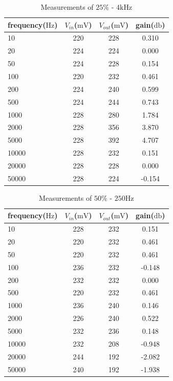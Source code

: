 \begin{table}[!htbp]
	\centering
	\caption{Measurements of $25\%$ - $4\si{\kilo\hertz}$}
	\label{tab:data02}
	\begin{tabular}{lccc}
		\toprule
		frequency($\si{\hertz}$) & $V_{in}$($\si{\milli\volt}$) & $V_{out}$($\si{\milli\volt}$) & gain($\si{\decibel}$) \\
		\midrule
		10&	220&	228&	0.310\\
		20&	224&	224&	0.000\\
		50&	224&	228&	0.154\\
		100&	220&	232&	0.461\\
		200&	224&	240&	0.599\\
		500&	224&	244&	0.743\\
		1000&	228&	280&	1.784\\
		2000&	228&	356&	3.870\\
		5000&	228&	392&	4.707\\
		10000&	228&	232&	0.151\\
		20000&	228&	228&	0.000\\
		50000&	228&	224&	-0.154\\
		\bottomrule
	\end{tabular}
\end{table}


\begin{table}[!htbp]
	\centering
	\caption{Measurements of $50\%$ - $250\si{\hertz}$}
	\label{tab:data10}
	\begin{tabular}{lccc}
		\toprule
		frequency($\si{\hertz}$) & $V_{in}$($\si{\milli\volt}$) & $V_{out}$($\si{\milli\volt}$) & gain($\si{\decibel}$) \\
		\midrule
		10&	228&	232&	0.151\\
		20&	220&	232&	0.461\\
		50&	220&	232&	0.461\\
		100&	236&	232&	-0.148\\
		200&	232&	232&	0.000\\
		500&	220&	232&	0.461\\
		1000&	236&	240&	0.146\\
		2000&	226&	240&	0.522\\
		5000&	232&	236&	0.148\\
		10000&	232&	208&	-0.948\\
		20000&	244&	192&	-2.082\\
		50000&	240&	192&	-1.938\\
		\bottomrule
	\end{tabular}
\end{table}

